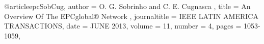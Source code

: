 @article{epcSobCug,
	author = {O. G. Sobrinho and C. E. Cugnasca },
	title = {An Overview Of The EPCglobal® Network 
},
journaltitle = {IEEE LATIN AMERICA TRANSACTIONS},
date = {JUNE 2013},
volume = {11},
number = {4},
pages = {1053-1059},
}
